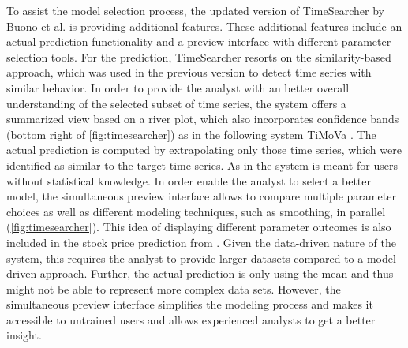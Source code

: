 \documentclass[electronic]{vgtc}             %
\begin{document}
To assist the model selection process, the updated version of TimeSearcher by Buono et al. \cite{buono:2007} is providing additional features.  
These additional features include an actual prediction functionality and a preview interface with different parameter selection tools.
For the prediction, TimeSearcher resorts on the similarity-based approach, which was used in the previous version \cite{buono:2005} to detect time series with similar behavior.
In order to provide the analyst with an better overall understanding of the selected subset of time series, the system offers a summarized view based on a river plot, which also incorporates confidence bands (bottom right of \autoref{fig:timesearcher}) as in the following system TiMoVa \cite{boegl:2013} .
The actual prediction is computed by extrapolating only those time series, which were identified as similar to the target time series.
As in \cite{buono:2005} the system is meant for users without statistical knowledge.
In order enable the analyst to select a better model, the simultaneous preview interface allows to compare multiple parameter choices as well as different modeling techniques, such as smoothing, in parallel (\autoref{fig:timesearcher}).
This idea of displaying different parameter outcomes is also included in the stock price prediction from \cite{ichikawa:2002}.
Given the data-driven nature of the system, this requires the analyst to provide larger datasets compared to a model-driven approach.
Further, the actual prediction is only using the mean and thus might not be able to represent more complex data sets. 
However, the simultaneous preview interface simplifies the modeling process and makes it accessible to untrained users and allows experienced analysts to get a better insight.
\end{document}
